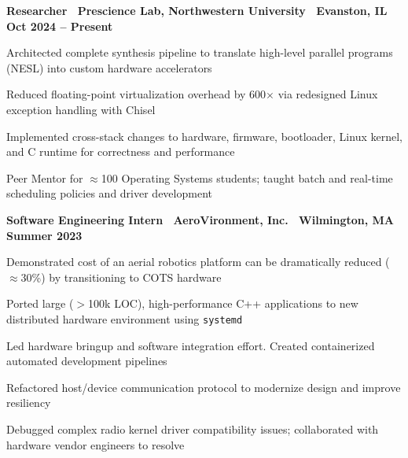 \documentclass[10pt]{article}
\newenvironment{mylist}[1][]
{\itemize[nosep, wide=0pt, leftmargin=*, after=\strut]}
{\enditemize}
\begin{document}
\begin{minipage}[t]{\linewidth}
    \textbf{Researcher \textbar \ Prescience Lab, Northwestern University \textbar \ Evanston, IL} \hfill \textbf{Oct 2024 -- Present} 
    \begin{mylist}
        \item Architected complete synthesis pipeline to translate high-level parallel programs (NESL) into custom hardware accelerators
        \item Reduced floating-point virtualization overhead by 600\(\times\) via redesigned Linux exception handling with Chisel
        \item Implemented cross-stack changes to hardware, firmware, bootloader, Linux kernel, and C runtime for correctness and performance
        \item Peer Mentor for $\approx$100 Operating Systems students; taught batch and real-time scheduling policies and driver development
    \end{mylist}
\end{minipage}

\begin{minipage}[t]{\linewidth}
    \textbf{Software Engineering Intern \textbar \ AeroVironment, Inc. \textbar \ Wilmington, MA} \hfill \textbf{Summer 2023} 
    \begin{mylist}
        \item Demonstrated cost of an aerial robotics platform can be dramatically reduced ($\approx$30\%) by transitioning to COTS hardware
        \item Ported large ($>$100k LOC), high-performance C++ applications to new distributed hardware environment using \texttt{systemd}
        \item Led hardware bringup and software integration effort. Created containerized automated development pipelines
        \item Refactored host/device communication protocol to modernize design and improve resiliency
        \item Debugged complex radio kernel driver compatibility issues; collaborated with hardware vendor engineers to resolve
    \end{mylist}
\end{minipage}
\end{document}
